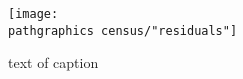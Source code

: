 \begin{figure}[t]
	\texttt{[image: \\pathgraphics census/"residuals"]}
	\caption{text of caption}
\end{figure}

\endinput  %

